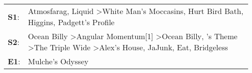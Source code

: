 \begin{supertabular}{p{0.03\textwidth}p{0.92\textwidth}}
 \textbf{S1}:  &                                                                                                                                                   Atmosfarag\textsuperscript{}, \enspace Liquid\textsuperscript{} \textgreater \enspace White Man's Moccasins\textsuperscript{}, \enspace Hurt Bird Bath\textsuperscript{}, \enspace Higgins\textsuperscript{}, \enspace Padgett's Profile\textsuperscript{}  \enspace  \\
 \textbf{S2}:  &  Ocean Billy\textsuperscript{} \textgreater \enspace Angular Momentum[1]\textsuperscript{} \textgreater \enspace Ocean Billy\textsuperscript{}, 's Theme\textsuperscript{} \textgreater \enspace The Triple Wide\textsuperscript{} \textgreater \enspace Alex's House\textsuperscript{}, \enspace JaJunk\textsuperscript{}, \enspace Eat\textsuperscript{}, \enspace Bridgeless\textsuperscript{}  \enspace  \\
 \textbf{E1}:  &                                                                                                                                                                                                                                                                                                                                                                           Mulche's Odyssey\textsuperscript{}  \enspace  \\
\end{supertabular}
